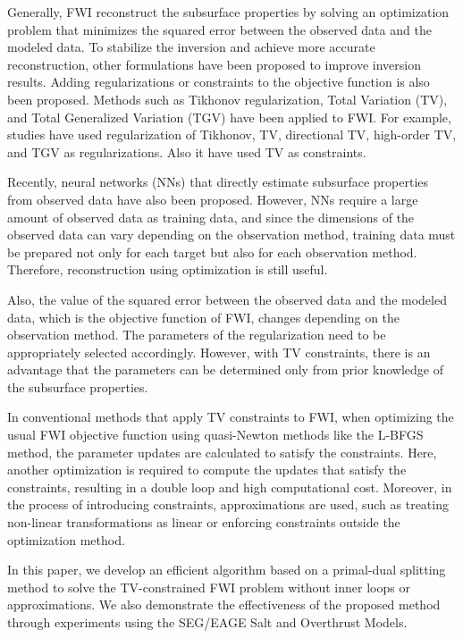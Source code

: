 Generally, FWI reconstruct the subsurface properties by solving an optimization problem that minimizes the squared error between the observed data and the modeled data.
To stabilize the inversion and achieve more accurate reconstruction, other formulations have been proposed to improve inversion results\cite{CustomFWI0,CustomFWI1,CustomFWI2,CustomFWI3,CustomFWI4,CustomFWI5}.
Adding regularizations or constraints to the objective function is also been proposed.
Methods such as Tikhonov regularization\cite{tikhonov}, Total Variation (TV)\cite{TV}, and Total Generalized Variation (TGV)\cite{TGV} have been applied to FWI.
For example, studies have used regularization of Tikhonov\cite{FWI-with-tikhonov-regularization}, TV\cite{FWI-with-TV-regularization}, directional TV\cite{FWI-with-directional-TV-regularization}, high-order TV\cite{FWI-with-high-order-TV-regularization}, and TGV as regularizations\cite{FWI-with-TGV-regularization}.
Also it have used TV as constraints\cite{FWI-with-TV-constraint,FWI-with-TV-constraint2,FWI-with-TV-constraint3}.

Recently, neural networks (NNs) that directly estimate subsurface properties from observed data have also been proposed\cite{ML-FWI0,ML-FWI1,ML-FWI2,ML-FWI3}.
However, NNs require a large amount of observed data as training data, and since the dimensions of the observed data can vary depending on the observation method, training data must be prepared not only for each target but also for each observation method.
Therefore, reconstruction using optimization is still useful.

Also, the value of the squared error between the observed data and the modeled data, which is the objective function of FWI, changes depending on the observation method.
The parameters of the regularization need to be appropriately selected accordingly.
However, with TV constraints, there is an advantage that the parameters can be determined only from prior knowledge of the subsurface properties\cite{constraints-vs-penalties-in-FWI}.

In conventional methods that apply TV constraints to FWI\cite{FWI-with-TV-constraint,FWI-with-TV-constraint2}, when optimizing the usual FWI objective function using quasi-Newton methods like the L-BFGS method, the parameter updates are calculated to satisfy the constraints.
Here, another optimization is required to compute the updates that satisfy the constraints, resulting in a double loop and high computational cost.
Moreover, in the process of introducing constraints, approximations are used, such as treating non-linear transformations as linear or enforcing constraints outside the optimization method.

In this paper, we develop an efficient algorithm based on a primal-dual splitting method to solve the TV-constrained FWI problem without inner loops or approximations.
We also demonstrate the effectiveness of the proposed method through experiments using the SEG/EAGE Salt and Overthrust Models.







